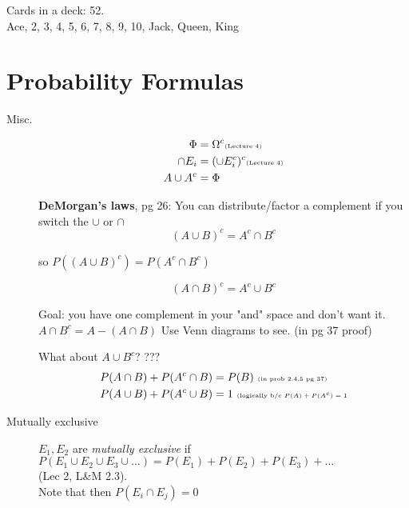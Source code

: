
Cards in a deck: 52.  \hfill \\
Ace, 2, 3, 4, 5, 6, 7, 8, 9, 10, Jack, Queen, King \hfill \\


\section{Probability Formulas}

\begin{description}
	\item[Misc.] 
		\begin{align*}
		\Phi &= \Omega^c   \mbox{\tiny{(Lecture 4)}}  \\
		\cap E_i &= (\cup E_i^c)^c       \mbox{\tiny{(Lecture 4)}}  \\
		A \cup A^{c} &= \Phi  
		\end{align*}

		
		\textbf{DeMorgan's laws}, pg 26:  You can distribute/factor a complement if you switch the $\cup$ or $\cap$ \\
		\[  (A \cup B)^c = A^c \cap B^c  \]
		\begin{center} \tiny{so $P((A \cup B)^c) = P(A^c \cap B^c)$}   \end{center}  
		\[   (A \cap B)^c = A^c \cup B^c  \]
		
		Goal: you have one complement in your "and" space and don't want it.  $A \cap B^c = A -(A \cap B)$  Use Venn diagrams to see.   (in pg 37 proof)
		
		What about $A \cup B^c$?  ???
		\hfill \\
		\begin{align*}
		P(A \cap B) + P(A^c \cap B) &= P(B)  \mbox{   \tiny{(in prob 2.4.5 pg 37)}}   \\
		P(A \cup B) + P(A^c \cup B) &= 1  \mbox{   \tiny{(logically b/c $P(A) + P(A^c) = 1$}}  \\
		\end{align*}
		
	\item[Mutually exclusive] ${E_1}, {E_2}$ are \textit{mutually exclusive} if 
        		$P({E_1} \cup {E_2} \cup {E_3} \cup ...) = P({E_1}) + P({E_2}) + P({E_3}) + ...$   \\
		{ \tiny (Lec 2, L\&M 2.3)}.   \\
		Note that then $ P(E_i \cap E_j) = 0 $
\end{description}

